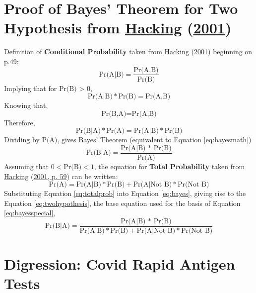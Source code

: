 \documentclass[12pt,twoside]{reedthesis}
\begin{document}
\hypertarget{bayesproof}{%
\section{\texorpdfstring{Proof of Bayes' Theorem for Two Hypothesis from \protect\hyperlink{ref-hackingIntroductionProbabilityInductive2001}{Hacking} (\protect\hyperlink{ref-hackingIntroductionProbabilityInductive2001}{2001})}{Proof of Bayes' Theorem for Two Hypothesis from Hacking (2001)}}\label{bayesproof}}

Definition of \textbf{Conditional Probability} taken from \protect\hyperlink{ref-hackingIntroductionProbabilityInductive2001}{Hacking} (\protect\hyperlink{ref-hackingIntroductionProbabilityInductive2001}{2001}) beginning on p.49:
\begin{equation}
\text{Pr(A|B)}= \frac{\text{Pr(A,B)}}{\text{Pr(B)}} 
\label{eq:conditionalprob}
\end{equation}
Implying that for \(\text{Pr(B) > 0}\),
\begin{equation}
\text{Pr(A|B)} * \text{Pr(B)} = \text{Pr(A,B)}  
\label{eq:conditionalprobproof1}
\end{equation}
Knowing that,
\begin{equation}
\text{Pr(B,A)} = \text{Pr(A,B)} 
\label{eq:conditionalprobproof2}
\end{equation}
Therefore,
\begin{equation}
\text{Pr(B|A)} * \text{Pr(A)} = \text{Pr(A|B)} * \text{Pr(B)} 
\label{eq:conditionalprobproof3}
\end{equation}
Dividing by \(\text{P(A)}\), gives Bayes' Theorem (equivalent to Equation \eqref{eq:bayesmath})
\begin{equation}
\text{Pr(B|A)}= \frac{\text{Pr(A|B) * Pr(B)}}{\text{Pr(A)}} 
\label{eq:bayes}
\end{equation}
Assuming that \(0 < \text{Pr(B)} < 1\), the equation for \textbf{Total Probability} taken from \protect\hyperlink{ref-hackingIntroductionProbabilityInductive2001}{Hacking} (\protect\hyperlink{ref-hackingIntroductionProbabilityInductive2001}{2001, p. 59}) can be written:
\begin{equation}
\text{Pr(A)} = \text{Pr(A|B)} * \text{Pr(B)} + \text{Pr(A|Not B)} * \text{Pr(Not B)}
\label{eq:totalprob}
\end{equation}
Substituting Equation \eqref{eq:totalprob} into Equation \eqref{eq:bayes}, giving rise to the Equation \eqref{eq:twohypothesis}, the base equation used for the basis of Equation \eqref{eq:bayesspecial},
\begin{equation}
\text{Pr(B|A)}= \frac{\text{Pr(A|B) * Pr(B)}}{\text{Pr(A|B)} * \text{Pr(B)} + \text{Pr(A|Not B)} * \text{Pr(Not B)}} 
\label{eq:twohypothesis}
\end{equation}
\hypertarget{covidex}{%
\section{Digression: Covid Rapid Antigen Tests}\label{covidex}}
\end{document}
